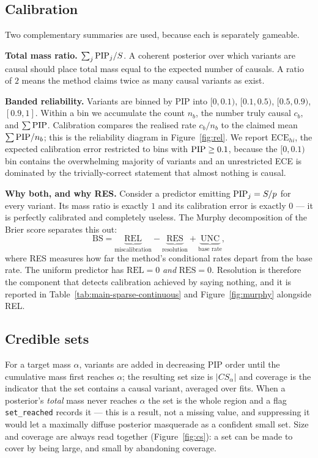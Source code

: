\subsection{Calibration}\label{sec:calibmethod}

Two complementary summaries are used, because each is separately gameable.

\textbf{Total mass ratio.} $\sum_j \mathrm{PIP}_j / S$. A coherent posterior over which
variants are causal should place total mass equal to the expected number of
causals. A ratio of $2$ means the method claims twice as many causal variants
as exist.

\textbf{Banded reliability.} Variants are binned by PIP into
$[0,0.1)$, $[0.1,0.5)$, $[0.5,0.9)$, $[0.9,1]$. Within a bin we accumulate the
count $n_b$, the number truly causal $c_b$, and $\sum\mathrm{PIP}$. Calibration
compares the realised rate $c_b/n_b$ to the claimed mean $\sum\mathrm{PIP}/n_b$; this is
the reliability diagram in Figure~\ref{fig:rel}. We report
$\mathrm{ECE}_{hi}$, the expected calibration error restricted to bins with
$\mathrm{PIP}\ge0.1$, because the $[0,0.1)$ bin contains the overwhelming majority of
variants and an unrestricted ECE is dominated by the trivially-correct
statement that almost nothing is causal.

\textbf{Why both, and why RES.} Consider a predictor emitting $\mathrm{PIP}_j=S/p$ for
every variant. Its mass ratio is exactly $1$ and its calibration error is
exactly $0$ --- it is perfectly calibrated and completely useless. The Murphy
decomposition of the Brier score separates this out:
\begin{equation}
\mathrm{BS}=\underbrace{\mathrm{REL}}_{\text{miscalibration}}-\underbrace{\mathrm{RES}}_{\text{resolution}}+\underbrace{\mathrm{UNC}}_{\text{base rate}},
\end{equation}
where RES measures how far the method's conditional rates depart from the base
rate. The uniform predictor has $\mathrm{REL}=0$ \emph{and} $\mathrm{RES}=0$.
Resolution is therefore the component that detects calibration achieved by
saying nothing, and it is reported in Table~\ref{tab:main-sparse-continuous} and
Figure~\ref{fig:murphy} alongside REL.

\subsection{Credible sets}\label{sec:cs}

For a target mass $\alpha$, variants are added in decreasing PIP order until the
cumulative mass first reaches $\alpha$; the resulting set size is
$|CS_\alpha|$ and coverage is the indicator that the set contains a causal
variant, averaged over fits. When a posterior's \emph{total} mass never reaches
$\alpha$ the set is the whole region and a flag \texttt{set\_reached} records
it --- this is a result, not a missing value, and suppressing it would let a
maximally diffuse posterior masquerade as a confident small set. Size and
coverage are always read together (Figure~\ref{fig:cs}): a set can be made to
cover by being large, and small by abandoning coverage.

